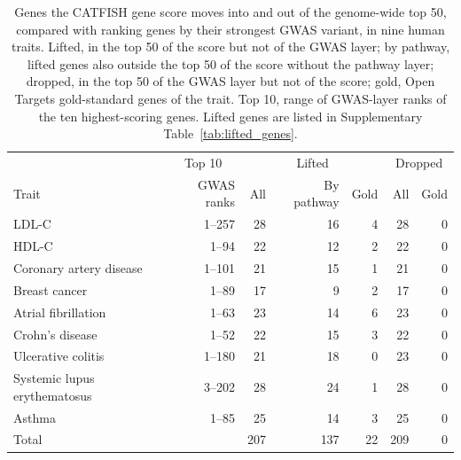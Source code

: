 \begin{table}[!t]
\centering
\caption{Genes the CATFISH gene score moves into and out of the genome-wide top 50, compared with ranking genes by their strongest GWAS variant, in nine human traits. Lifted, in the top 50 of the score but not of the GWAS layer; by pathway, lifted genes also outside the top 50 of the score without the pathway layer; dropped, in the top 50 of the GWAS layer but not of the score; gold, Open Targets gold-standard genes of the trait. Top 10, range of GWAS-layer ranks of the ten highest-scoring genes. Lifted genes are listed in Supplementary Table~\ref{tab:lifted_genes}.}
\label{tab:lifted_dropped}
\small
\begin{tabular*}{\linewidth}{@{\extracolsep{\fill}}lrrrrrr}
\hline
& \multicolumn{1}{c}{Top 10} & \multicolumn{3}{c}{Lifted} & \multicolumn{2}{c}{Dropped} \\
Trait & GWAS ranks & All & By pathway & Gold & All & Gold \\
\hline
LDL-C & 1--257 & 28 & 16 & 4 & 28 & 0 \\
HDL-C & 1--94 & 22 & 12 & 2 & 22 & 0 \\
Coronary artery disease & 1--101 & 21 & 15 & 1 & 21 & 0 \\
Breast cancer & 1--89 & 17 & 9 & 2 & 17 & 0 \\
Atrial fibrillation & 1--63 & 23 & 14 & 6 & 23 & 0 \\
Crohn's disease & 1--52 & 22 & 15 & 3 & 22 & 0 \\
Ulcerative colitis & 1--180 & 21 & 18 & 0 & 23 & 0 \\
Systemic lupus erythematosus & 3--202 & 28 & 24 & 1 & 28 & 0 \\
Asthma & 1--85 & 25 & 14 & 3 & 25 & 0 \\
\hline
Total & & 207 & 137 & 22 & 209 & 0 \\
\hline
\end{tabular*}
\end{table}
